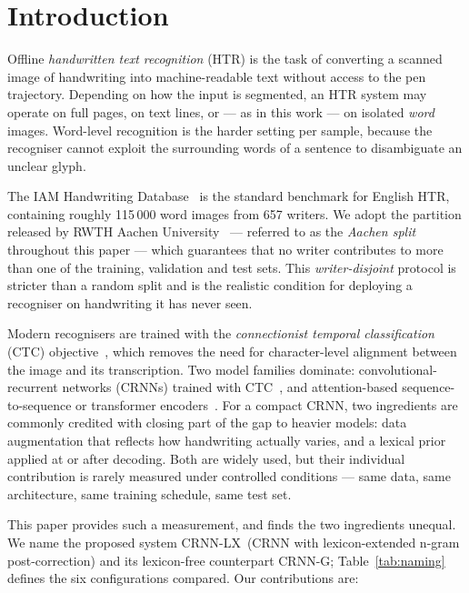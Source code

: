 \documentclass[conference]{IEEEtran}
\newcommand{\ours}{CRNN-LX}            %
\newcommand{\oursnolm}{CRNN-G}         %
\begin{document}
\section{Introduction}
\label{sec:intro}

Offline \emph{handwritten text recognition} (HTR) is the task of
converting a scanned image of handwriting into machine-readable text
without access to the pen trajectory. Depending on how the input is
segmented, an HTR system may operate on full pages, on text lines, or
--- as in this work --- on isolated \emph{word} images. Word-level
recognition is the harder setting per sample, because the recogniser
cannot exploit the surrounding words of a sentence to disambiguate an
unclear glyph.

The IAM Handwriting Database~\cite{marti2002iam} is the standard
benchmark for English HTR, containing roughly 115\,000 word images from
657 writers. We adopt the partition released by RWTH Aachen
University~\cite{aachen_split} --- referred to as the \emph{Aachen
split} throughout this paper --- which guarantees that no writer
contributes to more than one of the training, validation and test
sets. This \emph{writer-disjoint} protocol is stricter than a random
split and is the realistic condition for deploying a recogniser on
handwriting it has never seen.

Modern recognisers are trained with the \emph{connectionist temporal
classification} (CTC) objective~\cite{graves2006connectionist}, which
removes the need for character-level alignment between the image and
its transcription. Two model families dominate: convolutional-recurrent
networks (CRNNs) trained with CTC~\cite{shi2017crnn, puigcerver2017,
bluche2017gated}, and attention-based sequence-to-sequence or
transformer encoders~\cite{kang2018convolve, michael2019evaluating}.
For a compact CRNN, two ingredients are commonly credited with closing
part of the gap to heavier models: data augmentation that reflects how
handwriting actually varies, and a lexical prior applied at or after
decoding. Both are widely used, but their individual contribution is
rarely measured under controlled conditions --- same data, same
architecture, same training schedule, same test set.

This paper provides such a measurement, and finds the two ingredients
unequal. We name the proposed system \ours\ (CRNN with
lexicon-extended n-gram post-correction) and its lexicon-free
counterpart \oursnolm; Table~\ref{tab:naming} defines the six
configurations compared. Our contributions are:
\end{document}
